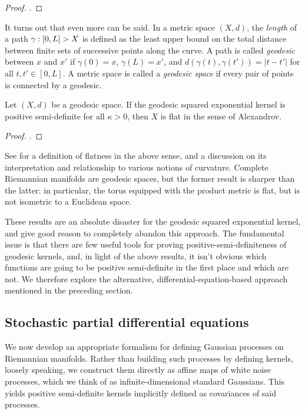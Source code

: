 \documentclass[11pt]{book}
\begin{document}
\begin{proof}
\textcite[Theorem 2]{feragen15}.
\end{proof}

It turns out that even more can be said.
In a metric space $(X,d)$, the \emph{length} of a path  $\gamma : [0,L] \-> X$ is defined as the least upper bound on the total distance between finite sets of successive points along the curve.
A path is called \emph{geodesic} between $x$ and $x'$ if $\gamma(0) = x$, $\gamma(L) = x'$, and $d(\gamma(t),\gamma(t')) = |t - t'|$ for all $t,t'\in[0,L]$.
A metric space is called a \emph{geodesic space} if every pair of points is connected by a geodesic.

\begin{result}
Let $(X,d)$ be a geodesic space.
If the geodesic squared exponential kernel is positive semi-definite for all $\kappa > 0$, then $X$ is flat in the sense of Alexandrov.
\end{result}

\begin{proof}
\textcite[Theorem 2]{feragen15}.
\end{proof}

See \textcite[Chapter 26]{villani08} for a definition of flatness in the above sense, and a discussion on its interpretation and relationship to various notions of curvature.
Complete Riemannian manifolds are geodesic spaces, but the former result is sharper than the latter: in particular, the torus equipped with the product metric is flat, but is not isometric to a Euclidean space.

These results are an absolute disaster for the geodesic squared exponential kernel, and give good reason to completely abandon this approach.
The fundamental issue is that there are few useful tools for proving positive-semi-definiteness of geodesic kernels, and, in light of the above results, it isn't obvious which functions are going to be positive semi-definite in the first place and which are not.
We therefore explore the alternative, differential-equation-based approach mentioned in the preceding section.

\subsection{Stochastic partial differential equations}

We now develop an appropriate formalism for defining Gaussian processes on Riemannian manifolds.
Rather than building such processes by defining kernels, loosely speaking, we construct them directly as affine maps of white noise processes, which we think of as infinite-dimensional standard Gaussians.
This yields positive semi-definite kernels implicitly defined as covariances of said processes.
\end{document}
